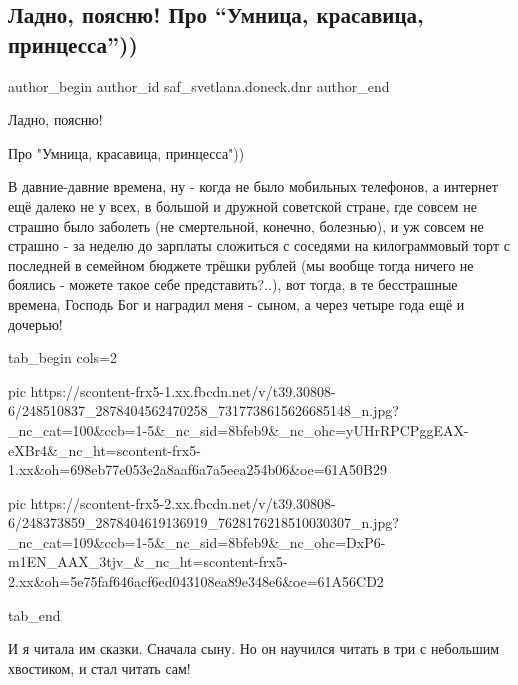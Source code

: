  
 
 
 
 
 
\subsection{Ладно, поясню! Про \enquote{Умница, красавица, принцесса}))}
\label{sec:29_10_2021.fb.saf_svetlana.doneck.dnr.1.umnica_krasavica}
 
\ifcmt
 author_begin
   author_id saf_svetlana.doneck.dnr
 author_end
\fi

Ладно, поясню!

Про "Умница, красавица, принцесса")) 

В давние-давние времена, ну - когда не было мобильных телефонов, а интернет ещё
далеко не у всех, в большой и дружной советской стране, где совсем не страшно
было заболеть (не смертельной, конечно, болезнью), и уж совсем не страшно -  за
неделю до зарплаты сложиться с соседями на килограммовый торт с последней в
семейном бюджете трёшки рублей (мы вообще тогда ничего не боялись - можете
такое себе представить?..), вот тогда, в те бесстрашные времена, Господь Бог и
наградил меня - сыном, а через четыре года ещё и дочерью!

\ifcmt
  tab_begin cols=2

     pic https://scontent-frx5-1.xx.fbcdn.net/v/t39.30808-6/248510837_2878404562470258_7317738615626685148_n.jpg?_nc_cat=100&ccb=1-5&_nc_sid=8bfeb9&_nc_ohc=yUHrRPCPggEAX-eXBr4&_nc_ht=scontent-frx5-1.xx&oh=698eb77e053e2a8aaf6a7a5eea254b06&oe=61A50B29

     pic https://scontent-frx5-2.xx.fbcdn.net/v/t39.30808-6/248373859_2878404619136919_7628176218510030307_n.jpg?_nc_cat=109&ccb=1-5&_nc_sid=8bfeb9&_nc_ohc=DxP6-m1EN_AAX_3tjv_&_nc_ht=scontent-frx5-2.xx&oh=5e75faf646acf6ed043108ea89e348e6&oe=61A56CD2

  tab_end
\fi

И я читала им сказки. Сначала сыну. Но он научился читать в три с небольшим
хвостиком, и стал читать сам!

